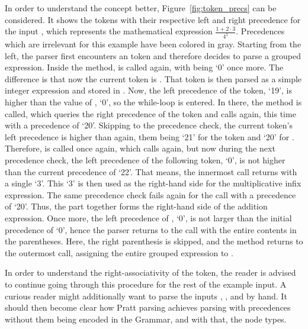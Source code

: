 In order to understand the concept better, Figure~\ref{fig:token_precs} can be considered.
It shows the tokens with their respective left and right precedence for the input , which represents the mathematical expression $\frac{1+2\cdot3}{4^5}$.
Precedences which are irrelevant for this example have been colored in gray.
Starting from the left, the parser first encounters an  token and therefore decides to parse a grouped expression.
Inside the  method,  is called again, with  being `0' once more.
The difference is that now the current token is .
That token is then parsed as a simple integer expression and stored in .
Now, the left precedence of the  token, `19', is higher than the value of , `0', so the while-loop is entered.
In there, the  method is called, which queries the right precedence of the  token and calls  again, this time with a precedence of `20'.
Skipping to the precedence check, the current token's left precedence is higher than  again, them being `21' for the  token and `20' for .
Therefore,  is called once again, which calls  again, but now during the next precedence check, the left precedence of the following  token, `0', is not higher than the current precedence of `22'.
That means, the innermost  call returns with a single `3'.
This `3' is then used as the right-hand side for the multiplicative infix expression.
The same  precedence check fails again for the  call with a precedence of `20'.
Thus, the  part together forms the right-hand side of the addition expression.
Once more, the left precedence of , `0', is not larger than the initial precedence of `0', hence the parser returns to the  call with the entire contents in the parentheses.
Here, the right parenthesis is skipped, and the method returns to the outermost  call, assigning the entire grouped expression to .

In order to understand the right-associativity of the  token, the reader is advised to continue going through this procedure for the rest of the example input.
A curious reader might additionally want to parse the inputs , , and  by hand.
It should then become clear how Pratt parsing achieves parsing with precedences without them being encoded in the Grammar, and with that, the node types.

